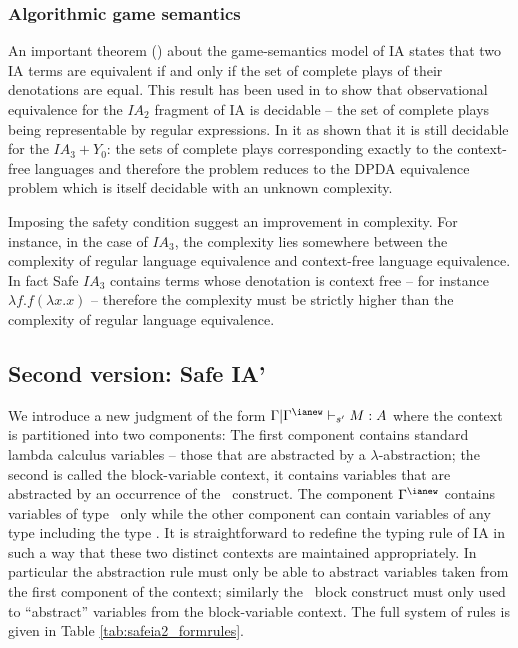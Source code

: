 
\subsubsection{Algorithmic game semantics}

An important theorem (\cite{AM97a}) about the game-semantics model
of IA states that two IA terms are equivalent if and only if the set
of complete plays of their denotations are equal. This result has
been used in \cite{ghicamccusker00} to show that observational
equivalence for the $IA_2$ fragment of IA is decidable -- the set of
complete plays being representable by regular expressions. In
\cite{Ong02} it as shown that it is still decidable
 for the $IA_3+Y_0$: the sets of complete plays corresponding exactly to the context-free languages
 and therefore the problem reduces to the DPDA equivalence problem which is itself decidable with an unknown
complexity.

Imposing the safety condition suggest an improvement in complexity.
For instance, in the case of $IA_3$, the complexity lies somewhere
between the complexity of regular language equivalence and
context-free language equivalence. In fact Safe $IA_3$ contains
terms whose denotation is context free -- for instance $\lambda f .
f (\lambda x .x )$ -- therefore the complexity must be strictly
higher than the complexity of regular language equivalence.


\subsection{Second version: Safe IA'}

We introduce a new judgment of the form $\Gamma | \Gamma^{\ianew}
\vdash_{s'} M : A$ where the context is partitioned into two
components: The first component contains standard lambda calculus
variables -- those that are abstracted by a $\lambda$-abstraction;
the second is called the block-variable context, it contains
variables that are abstracted by an occurrence of the \ianew\
construct. The component $\Gamma^{\ianew}$ contains variables of
type \iavar\ only while the other component can contain variables of
any type including the type \iavar. It is straightforward to
redefine the typing rule of IA in such a way that these two distinct
contexts are maintained appropriately. In particular the abstraction
rule must only be able to abstract variables taken from the first
component of the context; similarly the \ianew\ block construct must
only used to ``abstract'' variables from the block-variable context.
The full system of rules is given in Table
\ref{tab:safeia2_formrules}.

